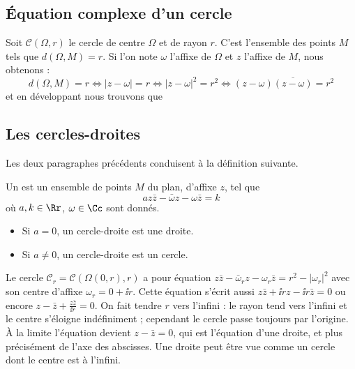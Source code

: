 \documentclass[11pt,class=report,crop=false]{standalone}
\begin{document}
\subsection{\'Equation complexe d'un cercle}

Soit $\mathcal{C}(\Omega,r)$ le cercle de centre $\Omega$ et de rayon $r$.
C'est l'ensemble des points $M$ tels que $d(\Omega,M)=r$. Si l'on note $\omega$ l'affixe
de $\Omega$ et $z$ l'affixe de $M$, nous obtenons :
$$d(\Omega,M) = r \iff  |z-\omega|=r \iff |z-\omega|^2=r^2 \iff (z-\omega)\overline{(z-\omega)}=r^2$$
et en développant nous trouvons que\\


\subsection{Les cercles-droites}

Les deux paragraphes précédents conduisent à la définition suivante.
\begin{proposition}
 Un  est un ensemble de points $M$ du plan, d'affixe $z$,
 tel que
$$az\bar z - \bar \omega z - \omega \bar z = k$$
 où $a,k \in \Rr$, $\omega \in \Cc$ sont donnés.
 \begin{itemize}
  \item Si $a=0$, un cercle-droite est une droite.
  \item Si $a\neq 0$, un cercle-droite est un cercle.
 \end{itemize}
\end{proposition}


\begin{exemple}
Le cercle $\mathcal{C}_r = \mathcal{C}(\Omega(0,r),r)$ a pour équation
$z\bar z - \bar \omega_r z - \omega_r \bar z = r^2-|\omega_r|^2$
avec son centre d'affixe $\omega_r = 0+\ii r$. Cette équation s'écrit aussi
$z\bar z +\ii rz-\ii r\bar z =0$ ou encore $z-\bar z + \frac{z\bar z}{\ii r} = 0$.
On fait tendre $r$  vers l'infini : le rayon tend vers l'infini et le centre s'éloigne indéfiniment ; cependant le cercle passe toujours par l'origine. 
\`A la limite l'équation devient
$z-\bar z = 0$, qui est l'équation d'une droite, et plus précisément de l'axe des abscisses.
Une droite peut être vue comme un cercle dont le centre est à l'infini.
\end{exemple}
\end{document}
